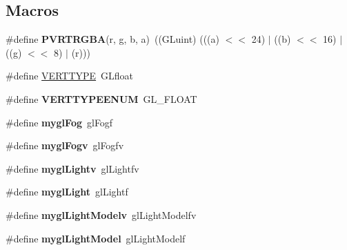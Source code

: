 \subsection*{Macros}
\begin{DoxyCompactItemize}
\item 
\hypertarget{group___a_p_i___o_g_l_e_s_gae648106645c725cd951e175cca412570}{\#define {\bfseries P\+V\+R\+T\+R\+G\+B\+A}(r, g, b, a)~((G\+Luint) (((a) $<$$<$ 24) $\vert$ ((b) $<$$<$ 16) $\vert$ ((g) $<$$<$ 8) $\vert$ (r)))}\label{group___a_p_i___o_g_l_e_s_gae648106645c725cd951e175cca412570}

\item 
\#define \hyperlink{group___a_p_i___o_g_l_e_s_ga06da457b7d3e93368ab904f89e1396be}{V\+E\+R\+T\+T\+Y\+P\+E}~G\+Lfloat
\item 
\hypertarget{group___a_p_i___o_g_l_e_s_gaf1e42706f4da84cdd82e4a7493df4551}{\#define {\bfseries V\+E\+R\+T\+T\+Y\+P\+E\+E\+N\+U\+M}~G\+L\+\_\+\+F\+L\+O\+A\+T}\label{group___a_p_i___o_g_l_e_s_gaf1e42706f4da84cdd82e4a7493df4551}

\item 
\hypertarget{group___a_p_i___o_g_l_e_s_ga38f7f5dc2671d578cfb9b5b4e53d8680}{\#define {\bfseries mygl\+Fog}~gl\+Fogf}\label{group___a_p_i___o_g_l_e_s_ga38f7f5dc2671d578cfb9b5b4e53d8680}

\item 
\hypertarget{group___a_p_i___o_g_l_e_s_ga60351fdef40702027f2189a9fa8fc8b7}{\#define {\bfseries mygl\+Fogv}~gl\+Fogfv}\label{group___a_p_i___o_g_l_e_s_ga60351fdef40702027f2189a9fa8fc8b7}

\item 
\hypertarget{group___a_p_i___o_g_l_e_s_ga1387ad87492dbed0e264144566e54190}{\#define {\bfseries mygl\+Lightv}~gl\+Lightfv}\label{group___a_p_i___o_g_l_e_s_ga1387ad87492dbed0e264144566e54190}

\item 
\hypertarget{group___a_p_i___o_g_l_e_s_ga7b6250b0a71d9ae70761f0f4df98e953}{\#define {\bfseries mygl\+Light}~gl\+Lightf}\label{group___a_p_i___o_g_l_e_s_ga7b6250b0a71d9ae70761f0f4df98e953}

\item 
\hypertarget{group___a_p_i___o_g_l_e_s_ga03a4c654184c551c7be96380128176d2}{\#define {\bfseries mygl\+Light\+Modelv}~gl\+Light\+Modelfv}\label{group___a_p_i___o_g_l_e_s_ga03a4c654184c551c7be96380128176d2}

\item 
\hypertarget{group___a_p_i___o_g_l_e_s_ga7e8721e3d6d58a95e659238b807477e2}{\#define {\bfseries mygl\+Light\+Model}~gl\+Light\+Modelf}\label{group___a_p_i___o_g_l_e_s_ga7e8721e3d6d58a95e659238b807477e2}


\end{DoxyCompactItemize}
